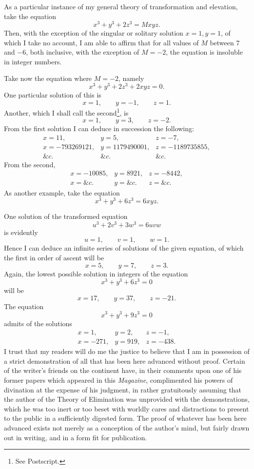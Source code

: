 \documentclass[11pt]{article}
\newcommand{\sourcepage}[1]{\marginpar{\scriptsize p.~#1}}
\begin{document}
As a particular instance of my general theory of transformation and elevation, take the equation
\[
x^3+y^3+2z^3=Mxyz.
\]
Then, with the exception of the singular or solitary solution $x=1,y=1$, of which I take no account, I am able to affirm that for all values of $M$ between $7$ and $-6$, both inclusive, with the exception of $M=-2$, the equation is insoluble in integer numbers.

Take now the equation where $M=-2$, namely
\[
x^3+y^3+2z^3+2xyz=0.
\]
One particular solution of this is
\[
x=1,\qquad y=-1,\qquad z=1.
\]
Another, which I shall call the second\footnote{See Postscript.}, is
\[
x=1,\qquad y=3,\qquad z=-2.
\]
From the first solution I can deduce in succession the following:
\[
\begin{array}{rrr}
x=11,& y=5,& z=-7,\\
x=-793269121,& y=1179490001,& z=-1189735855,\\
\&c.& \&c.& \&c.
\end{array}
\]
From the second,
\[
\begin{array}{rrr}
x=-10085,& y=8921,& z=-8442,\\
x=\&c.& y=\&c.& z=\&c.
\end{array}
\]
As another example, take the equation
\[
x^3+y^3+6z^3=6xyz.
\]

\sourcepage{113}
One solution of the transformed equation
\[
u^3+2v^3+3w^3=6uvw
\]
is evidently
\[
u=1,\qquad v=1,\qquad w=1.
\]
Hence I can deduce an infinite series of solutions of the given equation, of which the first in order of ascent will be
\[
x=5,\qquad y=7,\qquad z=3.
\]
Again, the lowest possible solution in integers of the equation
\[
x^3+y^3+6z^3=0
\]
will be
\[
x=17,\qquad y=37,\qquad z=-21.
\]
The equation
\[
x^3+y^3+9z^3=0
\]
admits of the solutions
\[
\begin{array}{rrr}
x=1,& y=2,& z=-1,\\
x=-271,& y=919,& z=-438.
\end{array}
\]
I trust that my readers will do me the justice to believe that I am in possession of a strict demonstration of all that has been here advanced without proof. Certain of the writer's friends on the continent have, in their comments upon one of his former papers which appeared in this \emph{Magazine}, complimented his powers of divination at the expense of his judgment, in rather gratuitously assuming that the author of the Theory of Elimination was unprovided with the demonstrations, which he was too inert or too beset with worldly cares and distractions to present to the public in a sufficiently digested form. The proof of whatever has been here advanced exists not merely as a conception of the author's mind, but fairly drawn out in writing, and in a form fit for publication.
\end{document}
